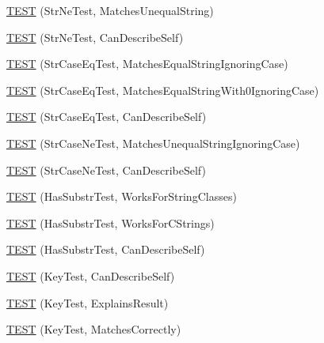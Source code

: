 \begin{DoxyCompactItemize}
\item 
\mbox{\hyperlink{namespacetesting_1_1gmock__matchers__test_a3c0a0ca54e3d34c55bd30c2b5572d902}{T\+E\+ST}} (Str\+Ne\+Test, Matches\+Unequal\+String)
\item 
\mbox{\hyperlink{namespacetesting_1_1gmock__matchers__test_a4daef0c28c6b07cb3d6a6306c05599b0}{T\+E\+ST}} (Str\+Ne\+Test, Can\+Describe\+Self)
\item 
\mbox{\hyperlink{namespacetesting_1_1gmock__matchers__test_ae0c0b82b3895923747dc70cb9339a8dc}{T\+E\+ST}} (Str\+Case\+Eq\+Test, Matches\+Equal\+String\+Ignoring\+Case)
\item 
\mbox{\hyperlink{namespacetesting_1_1gmock__matchers__test_aa159c9a52c6dc18cb7f214fbb5bddece}{T\+E\+ST}} (Str\+Case\+Eq\+Test, Matches\+Equal\+String\+With0\+Ignoring\+Case)
\item 
\mbox{\hyperlink{namespacetesting_1_1gmock__matchers__test_ab4fb6542ea3a7789850668a9266a80ef}{T\+E\+ST}} (Str\+Case\+Eq\+Test, Can\+Describe\+Self)
\item 
\mbox{\hyperlink{namespacetesting_1_1gmock__matchers__test_a9a627f8538cfff62fbaee86ac465f6c8}{T\+E\+ST}} (Str\+Case\+Ne\+Test, Matches\+Unequal\+String\+Ignoring\+Case)
\item 
\mbox{\hyperlink{namespacetesting_1_1gmock__matchers__test_ae953891c7961b6ffd51dc712be8d24de}{T\+E\+ST}} (Str\+Case\+Ne\+Test, Can\+Describe\+Self)
\item 
\mbox{\hyperlink{namespacetesting_1_1gmock__matchers__test_a2a1043a0b8bfb4bc0b5fb539317132a3}{T\+E\+ST}} (Has\+Substr\+Test, Works\+For\+String\+Classes)
\item 
\mbox{\hyperlink{namespacetesting_1_1gmock__matchers__test_a147dde340ba8f77308cd116d3bb831d6}{T\+E\+ST}} (Has\+Substr\+Test, Works\+For\+C\+Strings)
\item 
\mbox{\hyperlink{namespacetesting_1_1gmock__matchers__test_ae47e8ad8f8a4a33ac08b596eb839380e}{T\+E\+ST}} (Has\+Substr\+Test, Can\+Describe\+Self)
\item 
\mbox{\hyperlink{namespacetesting_1_1gmock__matchers__test_acdbdca45a537261fd168cdb8df9348d7}{T\+E\+ST}} (Key\+Test, Can\+Describe\+Self)
\item 
\mbox{\hyperlink{namespacetesting_1_1gmock__matchers__test_a38169c972e14fef59a41e532fb5b431e}{T\+E\+ST}} (Key\+Test, Explains\+Result)
\item 
\mbox{\hyperlink{namespacetesting_1_1gmock__matchers__test_a39f4f76617c414ab715b701eb82eeee4}{T\+E\+ST}} (Key\+Test, Matches\+Correctly)
\item 

\end{DoxyCompactItemize}
